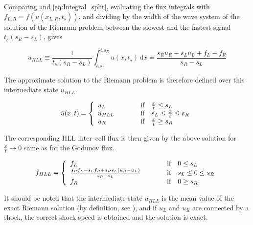 Comparing  and \eqref{eq:Integral_split}, evaluating the flux integrals with $f_{L,R} = f(u(x_{L,R}, t_{s}))$, and dividing by the width of the wave system of the solution of the Riemann problem between the slowest and the fastest signal $t_{s}(s_{R} - s_{L})$, gives

\begin{equation}
  u_{HLL} \equiv \frac{1}{t_{s}(s_{R} - s_{L})}\int_{t_{s}s_{L}}^{t_{s}s_{R}} u(x, t_{s})\,\mathrm{d}x = \frac{s_{R}u_{R} - s_{L}u_{L} + f_{L} - f_{R}}{s_{R} - s_{L}}
\label{eq:u_HLL}
\end{equation}

The approximate solution to the Riemann problem is therefore defined over this intermediate state $u_{HLL}$.

\begin{equation}
  \tilde{u}(x, t) = \left\{\begin{array}{l l l}
            u_{L} \hspace{1cm} &\text{if} \quad \frac{x}{t}\leq s_{L}\\
            u_{HLL} \hspace{1cm} &\text{if} \quad s_{L}\leq\frac{x}{t}\leq s_{R}\\
            u_{R} \hspace{1cm} &\text{if} \quad \frac{x}{t}\geq s_{R}
            \end{array} \right.
\end{equation}

The corresponding HLL inter--cell flux is then given by the above solution for $\frac{x}{t} \to 0$ same as for the Godunov flux.

\begin{equation}
  f_{HLL} = \left\{\begin{array}{l l l}
            f_{L} \hspace{1cm} &\text{if} \quad 0\leq s_{L}\\
            \frac{s_{R}f_{L} - s_{L}f_{R} + s_{R}s_{L}(u_{R} - u_{L})}{s_{R} - s_{L}} \hspace{1cm} &\text{if} \quad s_{L}\leq 0 \leq s_{R}\\
            f_{R} \hspace{1cm} &\text{if} \quad 0\geq s_{R}
            \end{array} \right.
\end{equation}

It should be noted that the intermediate state $u_{HLL}$ is the mean value of the exact Riemann solution (by definition, see ), and if $u_{L}$ and $u_{R}$ are connected by a shock, the correct shock speed is obtained and the solution is exact.

